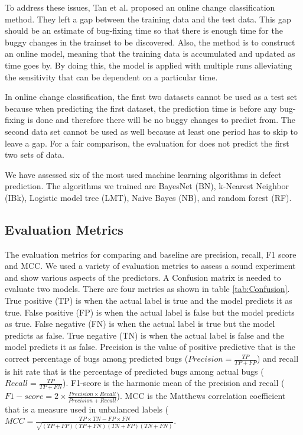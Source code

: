 To address these issues, Tan et al. \cite{tan2015online} proposed an online change classification method.
They left a gap between the training data and the test data.
This gap should be an estimate of bug-fixing time so that there is enough time for the buggy changes in the trainset to be discovered.
Also, the method is to construct an online model, meaning that the training data is accumulated and updated as time goes by.
By doing this, the model is applied with multiple runs alleviating the sensitivity that can be dependent on a particular time.

In online change classification, the first two datasets cannot be used as a test set because when predicting the first dataset, the prediction time is before any bug-fixing is done and therefore there will be no buggy changes to predict from. The second data set cannot be used as well because at least one period has to skip to leave a gap.
For a fair comparison, the evaluation for {\simfinmo} does not predict the first two sets of data.

We have assessed six of the most used machine learning algorithms in defect prediction.
The algorithms we trained are BayesNet (BN), k-Nearest Neighbor (IBk), Logistic model tree (LMT), Naive Bayes (NB), and random forest (RF).

\subsection{Evaluation Metrics}
The evaluation metrics for comparing {\simfinmo} and baseline are precision, recall, F1 score and MCC.
We used a variety of evaluation metrics to assess a sound experiment and show various aspects of the predictors.
A Confusion matrix is needed to evaluate two models.
There are four metrics as shown in table \ref{tab:Confusion}.
True positive (TP) is when the actual label is true and the model predicts it as true.
False positive (FP) is when the actual label is false but the model predicts as true.
False negative (FN) is when the actual label is true but the model predicts as false.
True negative (TN) is when the actual label is false and the model predicts it as false.
Precision is the value of positive predictive that is the correct percentage of bugs among predicted bugs ($Precision = \frac{TP}{TP + FP}$) and recall is hit rate that is the percentage of predicted bugs among actual bugs ($Recall = \frac{TP}{TP + FN}$).
F1-score is the harmonic mean of the precision and recall ($F1-score = 2 \times \frac{Precision \times Recall}{Precision + Recall}$). 
MCC is the Matthews correlation coefficient that is a measure used in unbalanced labels ($MCC = \frac{TP \times TN - FP \times FN}{\sqrt{(TP + FP)(TP + FN)(TN + FP)(TN + FN)}}$. 

